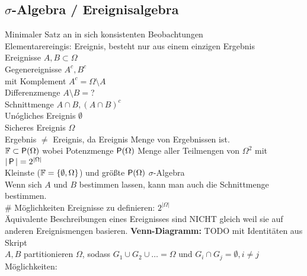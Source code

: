 \documentclass[german]{latex4ei/latex4ei_sheet}
\begin{document}
\subsection{$\sigma$-Algebra / Ereignisalgebra}
Minimaler Satz an in sich konsistenten Beobachtungen\\
Elementarereingis: Ereignis, besteht nur aus einem einzigen Ergebnis\\
Ereignisse $A,B \subset \Omega$\\
Gegenereignisse $A^c,B^c$\\
mit Komplement $A^c=\Omega \setminus A$\\
Differenzmenge $A \setminus B=$?\\
Schnittmenge $A \cap B, {(A \cap B)}^c$\\
Un\'ogliches Ereignis $\emptyset$\\
Sicheres Ereignis $\Omega$\\
Ergebnis $\neq$ Ereignis, da Ereignis Menge von Ergebnissen ist.\\
$\F \subset \P(\Omega)$ wobei Potenzmenge $\P(\Omega)$ Menge aller Teilmengen von $\Omega^2$ mit $|\P|=2^{|\Omega|}$\\
Kleinste ($\F=\{\emptyset,\Omega\}$) und gr\"o\ss{}te $\P(\Omega)$ $\sigma$-Algebra\\
Wenn sich $A$ und $B$ bestimmen lassen, kann man auch die Schnittmenge bestimmen.\\
$\#$ M\"oglichkeiten Ereignisse zu definieren: $2^{|\Omega|}$\\
\"Aquivalente Beschreibungen eines Ereignisses sind NICHT gleich weil sie auf anderen Ereignismengen basieren.
\textbf{Venn-Diagramm:}
TODO mit Identit\"aten aus Skript\\
$A,B$ partitionieren $\Omega$, sodass $G_1 \cup G_2 \cup \ldots=\Omega$ und $G_i \cap G_j = \emptyset , i \neq j$\\
M\"oglichkeiten:\\
\end{document}
